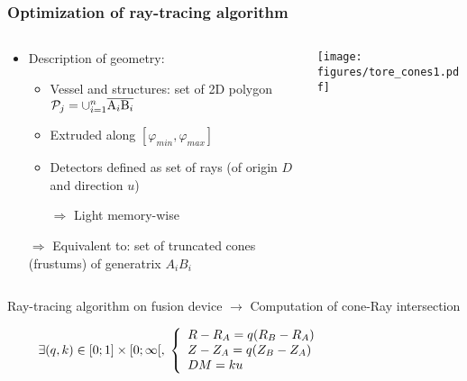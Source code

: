 \documentclass[10pt]{beamer}
\begin{document}
\begin{frame}
\frametitle{Optimization of ray-tracing algorithm}

\begin{columns}
\begin{column}{0.65\textwidth}
	\begin{itemize}
	\item Description of geometry:
	\begin{itemize}
		\item Vessel and structures:  set of 2D polygon $\mathcal{P}_j = \cup_{i=1}^n \overline{{\rm A}_i{\rm B}_i}$
		\item Extruded along $[\varphi_{min}, \varphi_{max}]$
		\item Detectors defined as set of rays (of origin $D$ and direction $u$)
		\item[{$\Rightarrow$}] Light memory-wise
	\end{itemize}
	\item[{$\Rightarrow$}] Equivalent to: set of truncated cones (frustums) of generatrix $A_iB_i$

	\end{itemize}
\end{column}
\begin{column}{0.35\textwidth}
\begin{center}
	\texttt{[image: figures/tore\_cones1.pdf]}
\end{center}
\end{column}
\end{columns}

\vspace{0.3cm}
\begin{alertblock}{Ray-tracing algorithm on fusion device $\longrightarrow$ Computation of cone-Ray intersection}
\end{alertblock}

$$
\hspace{-3cm}
\exists (q,k) \in [0;1]\times [0;\infty[, \;
\left\{\begin{array}{ll}
R-R_A = q(R_B-R_A)\\
Z-Z_A = q(Z_B-Z_A)\\
DM = k u
\end{array}\right.
$$

\end{frame}
\end{document}
